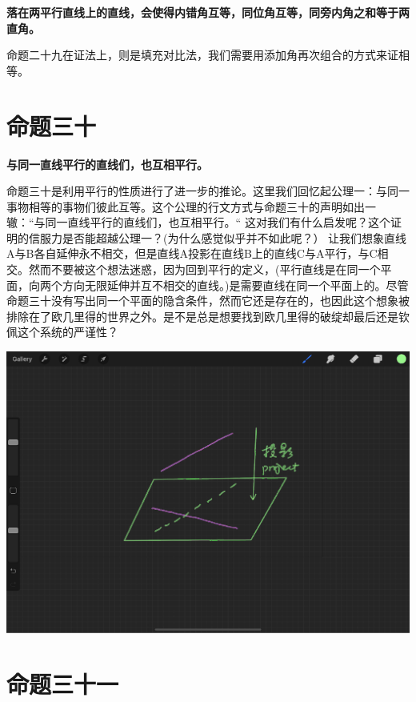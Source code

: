 \documentclass[
]{book}
\begin{document}
\textbf{落在两平行直线上的直线，会使得内错角互等，同位角互等，同旁内角之和等于两直角。}

命题二十九在证法上，则是填充对比法，我们需要用添加角再次组合的方式来证相等。

\hypertarget{ux547dux9898ux4e09ux5341}{%
\section{命题三十}\label{ux547dux9898ux4e09ux5341}}

\textbf{与同一直线平行的直线们，也互相平行。}

命题三十是利用平行的性质进行了进一步的推论。这里我们回忆起公理一：与同一事物相等的事物们彼此互等。这个公理的行文方式与命题三十的声明如出一辙：``与同一直线平行的直线们，也互相平行。`` 这对我们有什么启发呢？这个证明的信服力是否能超越公理一？(为什么感觉似乎并不如此呢？）
让我们想象直线A与B各自延伸永不相交，但是直线A投影在直线B上的直线C与A平行，与C相交。然而不要被这个想法迷惑，因为回到平行的定义，(平行直线是在同一个平面，向两个方向无限延伸并互不相交的直线。)是需要直线在同一个平面上的。尽管命题三十没有写出同一个平面的隐含条件，然而它还是存在的，也因此这个想象被排除在了欧几里得的世界之外。是不是总是想要找到欧几里得的破绽却最后还是钦佩这个系统的严谨性？

\includegraphics[width=1\linewidth]{./image/14-prop30-image13}

\hypertarget{ux547dux9898ux4e09ux5341ux4e00}{%
\section{命题三十一}\label{ux547dux9898ux4e09ux5341ux4e00}}
\end{document}

